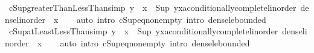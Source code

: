 \begin{isabellebody}
\endisatagproof
{\isafoldproof}%
%
\isadelimproof
\isanewline
%
\endisadelimproof
\isanewline
{}\isamarkupfalse%
\ cSup{\isacharunderscore}{\kern0pt}greaterThanLessThan{\isacharbrackleft}{\kern0pt}simp{\isacharbrackright}{\kern0pt}{\isacharcolon}{\kern0pt}\ {\isachardoublequoteopen}y\ {\isacharless}{\kern0pt}\ x\ {\isasymLongrightarrow}\ Sup\ {\isacharbraceleft}{\kern0pt}y{\isacharless}{\kern0pt}{\isachardot}{\kern0pt}{\isachardot}{\kern0pt}{\isacharless}{\kern0pt}x{\isacharcolon}{\kern0pt}{\isacharcolon}{\kern0pt}{\isacharprime}{\kern0pt}a{\isacharcolon}{\kern0pt}{\isacharcolon}{\kern0pt}{\isacharbraceleft}{\kern0pt}conditionally{\isacharunderscore}{\kern0pt}complete{\isacharunderscore}{\kern0pt}linorder{\isacharcomma}{\kern0pt}\ dense{\isacharunderscore}{\kern0pt}linorder{\isacharbraceright}{\kern0pt}{\isacharbraceright}{\kern0pt}\ {\isacharequal}{\kern0pt}\ x{\isachardoublequoteclose}\isanewline
%
\isadelimproof
\ \ %
\endisadelimproof
%
\isatagproof
{}\isamarkupfalse%
\ {\isacharparenleft}{\kern0pt}auto\ intro{\isacharbang}{\kern0pt}{\isacharcolon}{\kern0pt}\ cSup{\isacharunderscore}{\kern0pt}eq{\isacharunderscore}{\kern0pt}non{\isacharunderscore}{\kern0pt}empty\ intro{\isacharcolon}{\kern0pt}\ dense{\isacharunderscore}{\kern0pt}le{\isacharunderscore}{\kern0pt}bounded{\isacharparenright}{\kern0pt}%
\endisatagproof
{\isafoldproof}%
%
\isadelimproof
\isanewline
%
\endisadelimproof
\isanewline
{}\isamarkupfalse%
\ cSup{\isacharunderscore}{\kern0pt}atLeastLessThan{\isacharbrackleft}{\kern0pt}simp{\isacharbrackright}{\kern0pt}{\isacharcolon}{\kern0pt}\ {\isachardoublequoteopen}y\ {\isacharless}{\kern0pt}\ x\ {\isasymLongrightarrow}\ Sup\ {\isacharbraceleft}{\kern0pt}y{\isachardot}{\kern0pt}{\isachardot}{\kern0pt}{\isacharless}{\kern0pt}x{\isacharcolon}{\kern0pt}{\isacharcolon}{\kern0pt}{\isacharprime}{\kern0pt}a{\isacharcolon}{\kern0pt}{\isacharcolon}{\kern0pt}{\isacharbraceleft}{\kern0pt}conditionally{\isacharunderscore}{\kern0pt}complete{\isacharunderscore}{\kern0pt}linorder{\isacharcomma}{\kern0pt}\ dense{\isacharunderscore}{\kern0pt}linorder{\isacharbraceright}{\kern0pt}{\isacharbraceright}{\kern0pt}\ {\isacharequal}{\kern0pt}\ x{\isachardoublequoteclose}\isanewline
%
\isadelimproof
\ \ %
\endisadelimproof
%
\isatagproof
{}\isamarkupfalse%
\ {\isacharparenleft}{\kern0pt}auto\ intro{\isacharbang}{\kern0pt}{\isacharcolon}{\kern0pt}\ cSup{\isacharunderscore}{\kern0pt}eq{\isacharunderscore}{\kern0pt}non{\isacharunderscore}{\kern0pt}empty\ intro{\isacharcolon}{\kern0pt}\ dense{\isacharunderscore}{\kern0pt}le{\isacharunderscore}{\kern0pt}bounded{\isacharparenright}{\kern0pt}%

\end{isabellebody}
